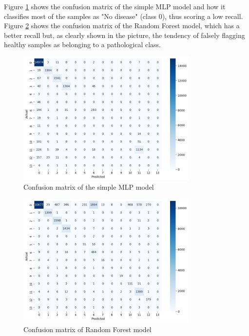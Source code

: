 \documentclass[a4paper,12pt]{article}
\begin{document}
Figure \ref{fig:conf-simp-mlp} shows the confusion matrix of the simple MLP model and how it classifies most of the samples as "No disease" (class 0), thus scoring a low recall.\\
Figure \ref{fig:conf-rand-for} shows the confusion matrix of the Random Forest model, which has a better recall but, as clearly shown in the picture, the tendency of falsely flagging healthy samples as belonging to a pathological class.


\begin{figure}[h!]
\centering
\includegraphics[width=0.8\textwidth]{Figs/conf-mat-simp-mlp.png}
\caption{Confusion matrix of the simple MLP model}
\label{fig:conf-simp-mlp}
\end{figure}
\newpage

\begin{figure}[h!]
\centering
\includegraphics[width=0.8\textwidth]{Figs/conf-mat-rand-for.png}
\caption{Confusion matrix of Random Forest model}
\label{fig:conf-rand-for}
\end{figure}
\newpage
\end{document}
